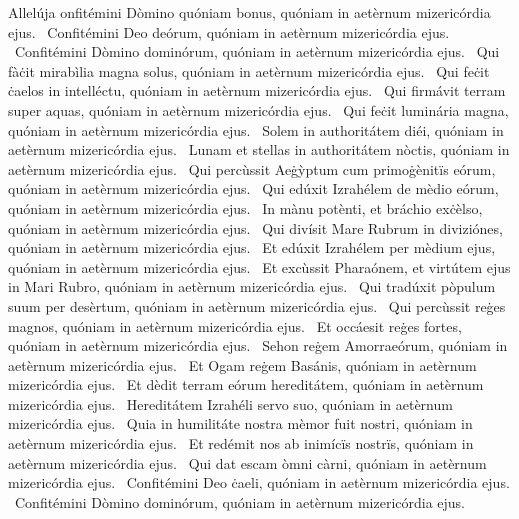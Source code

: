 { Allelúja}
{%
onfitémini Dòmino quóniam bonus, quóniam in aetèrnum mizericórdia ejus. 
~Confitémini Deo deórum, quóniam in aetèrnum mizericórdia ejus. 
~Confitémini Dòmino dominórum, quóniam in aetèrnum mizericórdia ejus. 
~Qui fàċit mirabìlia magna solus, quóniam in aetèrnum mizericórdia ejus. 
~Qui feċit ċaelos in intelléctu, quóniam in aetèrnum mizericórdia ejus. 
~Qui firmávit terram super aquas, quóniam in aetèrnum mizericórdia ejus. 
~Qui feċit luminária magna, quóniam in aetèrnum mizericórdia ejus. 
~Solem in authoritátem diéi, quóniam in aetèrnum mizericórdia ejus. 
~Lunam et stellas in authoritátem nòctis, quóniam in aetèrnum mizericórdia ejus. 
~Qui percùssit Aeġỳptum cum primoġènitïs eórum, quóniam in aetèrnum mizericórdia ejus. 
~Qui edúxit Izrahélem de mèdio eórum, quóniam in aetèrnum mizericórdia ejus. 
~In mànu potènti, et bráchio exċèlso, quóniam in aetèrnum mizericórdia ejus. 
~Qui divísit Mare Rubrum in diviziónes, quóniam in aetèrnum mizericórdia ejus. 
~Et edúxit Izrahélem per mèdium ejus, quóniam in aetèrnum mizericórdia ejus. 
~Et excùssit Pharaónem, et virtútem ejus in Mari Rubro, quóniam in aetèrnum mizericórdia ejus. 
~Qui tradúxit pòpulum suum per desèrtum, quóniam in aetèrnum mizericórdia ejus. 
~Qui percùssit reġes magnos, quóniam in aetèrnum mizericórdia ejus. 
~Et occáesit reġes fortes, quóniam in aetèrnum mizericórdia ejus. 
~Sehon reġem Amorraeórum, quóniam in aetèrnum mizericórdia ejus. 
~Et Ogam reġem Basánis, quóniam in aetèrnum mizericórdia ejus. 
~Et dèdit terram eórum hereditátem, quóniam in aetèrnum mizericórdia ejus. 
~Hereditátem Izrahéli servo suo, quóniam in aetèrnum mizericórdia ejus. 
~Quia in humilitáte nostra mèmor fuit nostri, quóniam in aetèrnum mizericórdia ejus. 
~Et redémit nos ab inimícïs nostrïs, quóniam in aetèrnum mizericórdia ejus. 
~Qui dat escam òmni càrni, quóniam in aetèrnum mizericórdia ejus. 
~Confitémini Deo ċaeli, quóniam in aetèrnum mizericórdia ejus. 
~Confitémini Dòmino dominórum, quóniam in aetèrnum mizericórdia ejus. 
}
